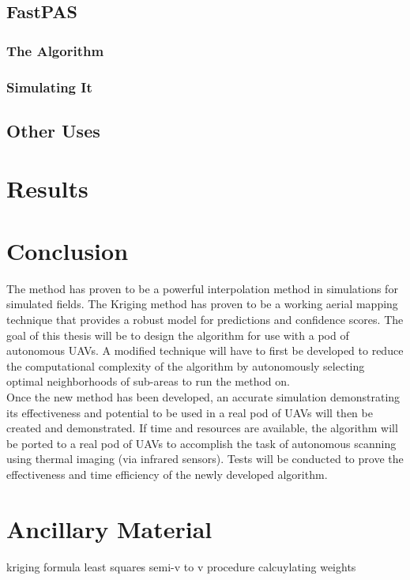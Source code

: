 \documentclass[11pt]{ucthesis}
\begin{document}
\section{FastPAS}
\subsection{The Algorithm}
\subsection{Simulating It}

\section{Other Uses}

\chapter{Results}

\chapter{Conclusion}
The method has proven to be a powerful interpolation method in simulations for simulated fields. The Kriging method has proven to be a working aerial mapping technique that provides a robust model for predictions and confidence scores. The goal of this thesis will be to design the algorithm for use with a pod of autonomous UAVs. A modified technique will have to first be developed to reduce the computational complexity of the algorithm by autonomously selecting optimal neighborhoods of sub-areas to run the method on.\\
Once the new method has been developed, an accurate simulation demonstrating its effectiveness and potential to be used in a real pod of UAVs will then be created and demonstrated. 
If time and resources are available, the algorithm will be ported to a real pod of UAVs to accomplish the task of autonomous scanning using thermal imaging (via infrared sensors). Tests will be conducted to prove the effectiveness and time efficiency of the newly developed algorithm.

\nocite{*}



\appendix
\chapter{Ancillary Material}
kriging formula
least squares
semi-v to v procedure
calcuylating weights
\end{document}
